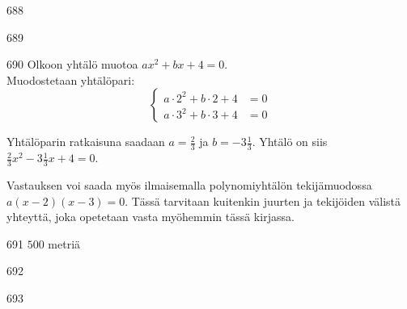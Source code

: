 \begin{Vastaus}{688}
    
\end{Vastaus}
\begin{Vastaus}{689}
    
\end{Vastaus}
\begin{Vastaus}{690}
		Olkoon yhtälö muotoa $ax^2+bx+4=0$. \\
      Muodostetaan yhtälöpari:
      \[
        \left\{
          \begin{aligned}
            a\cdot 2^2 + b\cdot 2 + 4 &= 0 \\
            a\cdot 3^2 + b\cdot 3 + 4 &= 0
          \end{aligned}
        \right.
      \]

      Yhtälöparin ratkaisuna saadaan $a=\frac23$ ja $b=-3\frac13$. Yhtälö on siis $\frac{2}{3}x^2-3\frac{1}{3}x+4=0$.

      Vastauksen voi saada myös ilmaisemalla polynomiyhtälön tekijämuodossa $a(x-2)(x-3)=0$. Tässä tarvitaan kuitenkin juurten ja tekijöiden välistä yhteyttä, joka opetetaan vasta myöhemmin tässä kirjassa.
    
\end{Vastaus}
\begin{Vastaus}{691}
$500$ metriä
\end{Vastaus}
\begin{Vastaus}{692}
    
\end{Vastaus}
\begin{Vastaus}{693}
    
\end{Vastaus}
